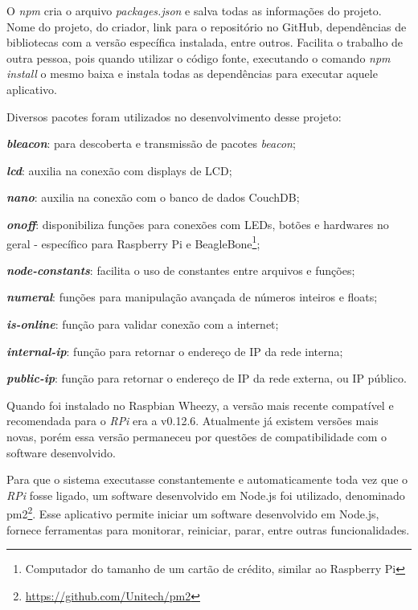 O \textit{npm} cria o arquivo \textit{packages.json} e salva todas as informações do projeto. Nome do projeto, do criador, link para o repositório no GitHub, dependências de bibliotecas com a versão específica instalada, entre outros. Facilita o trabalho de outra pessoa, pois quando utilizar o código fonte, executando o comando \textit{npm install} o mesmo baixa e instala todas as dependências para executar aquele aplicativo.

Diversos pacotes foram utilizados no desenvolvimento desse projeto:

\begin{alineas}
	\item \textbf{\textit{bleacon}}: para descoberta e transmissão de pacotes \textit{beacon};
	\item \textbf{\textit{lcd}}: auxilia na conexão com displays de LCD;
	\item \textbf{\textit{nano}}: auxilia na conexão com o banco de dados CouchDB;
	\item \textbf{\textit{onoff}}: disponibiliza funções para conexões com LEDs, botões e hardwares no geral - específico para Raspberry Pi e BeagleBone\footnote{Computador do tamanho de um cartão de crédito, similar ao Raspberry Pi};
	\item \textbf{\textit{node-constants}}: facilita o uso de constantes entre arquivos e funções;
	\item \textbf{\textit{numeral}}: funções para manipulação avançada de números inteiros e floats;
	\item \textbf{\textit{is-online}}: função para validar conexão com a internet;
	\item \textbf{\textit{internal-ip}}: função para retornar o endereço de IP da rede interna;
	\item \textbf{\textit{public-ip}}: função para retornar o endereço de IP da rede externa, ou IP público.
\end{alineas}

Quando foi instalado no Raspbian Wheezy, a versão mais recente compatível e recomendada para o \textit{RPi} era a v0.12.6. Atualmente já existem versões mais novas, porém essa versão permaneceu por questões de compatibilidade com o software desenvolvido.

Para que o sistema executasse constantemente e automaticamente toda vez que o \textit{RPi} fosse ligado, um software desenvolvido em Node.js foi utilizado, denominado pm2\footnote{\url{https://github.com/Unitech/pm2}}. Esse aplicativo permite iniciar um software desenvolvido em Node.js, fornece ferramentas para monitorar, reiniciar, parar, entre outras funcionalidades.

